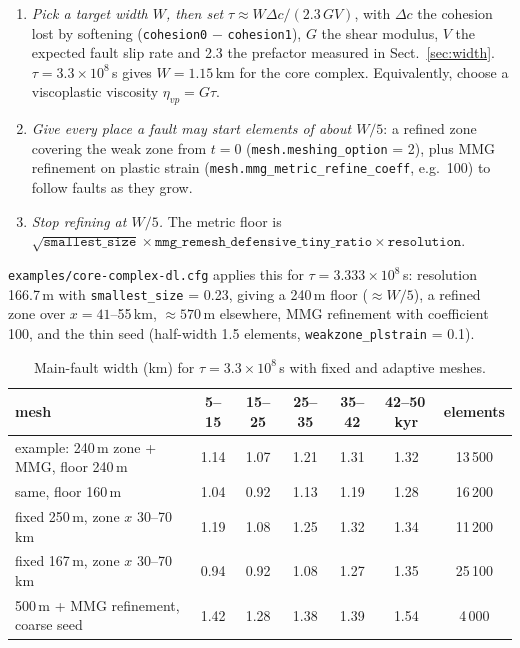 \documentclass[11pt]{article}
\newcommand{\code}[1]{\texttt{#1}}
\begin{document}
\begin{enumerate}
\item \emph{Pick a target width $W$, then set} $\tau\approx W\Delta c/(2.3\,GV)$, with $\Delta c$ the
  cohesion lost by softening (\code{cohesion0} $-$ \code{cohesion1}), $G$ the shear modulus, $V$
  the expected fault slip rate and 2.3 the prefactor measured in Sect.~\ref{sec:width}.
  $\tau=3.3\times10^8$\,s gives $W=1.15$\,km for the core complex.
  Equivalently, choose a viscoplastic viscosity $\eta_{vp}=G\tau$.
\item \emph{Give every place a fault may start elements of about $W/5$}: a refined zone covering the
  weak zone from $t=0$ (\code{mesh.meshing\_option} = 2), plus MMG refinement on plastic strain
  (\code{mesh.mmg\_metric\_refine\_coeff}, e.g.\ 100) to follow faults as they grow.
\item \emph{Stop refining at $W/5$.} The metric floor is
  $\sqrt{\code{smallest\_size}}\times\code{mmg\_remesh\_defensive\_tiny\_ratio}\times\code{resolution}$.
\end{enumerate}
\code{examples/core-complex-dl.cfg} applies this for $\tau=3.333\times10^8$\,s: resolution
166.7\,m with \code{smallest\_size} = 0.23, giving a 240\,m floor ($\approx W/5$), a refined zone over
$x=41$--55\,km, $\approx570$\,m elsewhere, MMG refinement with coefficient 100, and the thin seed
(half-width 1.5 elements, \code{weakzone\_plstrain} = 0.1).

\begin{table}[h]
  \centering\small
  \caption{Main-fault width (km) for $\tau=3.3\times10^8$\,s with fixed and adaptive meshes.}
  \label{tab:amr}
  \begin{tabular}{lcccccc}
  \toprule
  mesh & 5--15 & 15--25 & 25--35 & 35--42 & 42--50\,kyr & elements\\
  \midrule
  example: 240\,m zone + MMG, floor 240\,m & 1.14 & 1.07 & 1.21 & 1.31 & 1.32 & 13\,500\\
  same, floor 160\,m                       & 1.04 & 0.92 & 1.13 & 1.19 & 1.28 & 16\,200\\
  fixed 250\,m, zone $x$ 30--70\,km         & 1.19 & 1.08 & 1.25 & 1.32 & 1.34 & 11\,200\\
  fixed 167\,m, zone $x$ 30--70\,km         & 0.94 & 0.92 & 1.08 & 1.27 & 1.35 & 25\,100\\
  500\,m + MMG refinement, coarse seed      & 1.42 & 1.28 & 1.38 & 1.39 & 1.54 & 4\,000\\
  \bottomrule
  \end{tabular}
\end{table}
\end{document}
